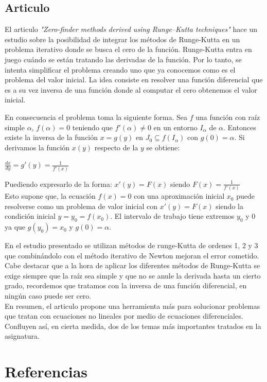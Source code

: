 \documentclass[paper=a4, fontsize=11pt]{scrartcl} %
\numberwithin{equation}{section}
\begin{document}
\subsection{Articulo}
El articulo \textit{"Zero-finder methods derived using Runge–Kutta techniques"} hace un estudio sobre la posibilidad de integrar los métodos de Runge-Kutta en un problema iterativo donde se busca el cero de la función. Runge-Kutta entra en juego cuándo se están tratando las derivadas de la función. Por lo tanto, se intenta simplificar el problema creando uno que ya conocemos como es el problema del valor inicial. La idea consiste en resolver una función diferencial que es a su vez inversa de una función  donde al computar el cero obtenemos el valor inicial. 

En consecuencia el problema toma la siguiente forma. Sea $f$ una función con raíz simple $\alpha$, $f(\alpha)=0$ teniendo que $f\prime(\alpha)\not=0$ en un entorno $I_\alpha$ de $\alpha$. Entonces existe la inversa de la función $x=g(y)$ en $J_0\subseteq f(I_\alpha)$ con $g(0)=\alpha$. Si derivamos la función $x(y)$ respecto de la $y$ se obtiene:

$\frac{dx}{dy} = g\prime(y) = \frac{1}{f\prime(x)}$

Puediendo expresarlo de la forma:
$x\prime(y) = F(x)$ siendo $F(x)=\frac{1}{f\prime(x)}$\\

Esto supone que, la ecuación $f(x)=0$ con una aproximación inicial $x_0$ puede resolverse como un problema de valor inicial con $x\prime(y) = F(x)$ siendo la condición inicial $y=y_0= f(x_0)$. El intervalo de trabajo tiene extremos $y_0$ y 0 ya que $g(y_0) = x_0$ y $g(0) = \alpha$.

En el estudio presentado se utilizan métodos de runge-Kutta de ordenes 1, 2 y 3 que combinándolo con el método iterativo de Newton mejoran el error cometido. Cabe destacar que a la hora de aplicar los diferentes métodos de Runge-Kutta se exige siempre que la raíz sea simple y que no se anule la derivada hasta un cierto grado, recordemos que tratamos con la inversa de una función diferencial, en ningún caso puede ser cero.\\

En resumen, el articulo propone una herramienta más para solucionar problemas que tratan con ecuaciones no lineales por medio de ecuaciones diferenciales. Confluyen así, en cierta medida, dos de los temas más importantes tratados en la asignatura. 

\newpage
\section{Referencias}
\end{document}
